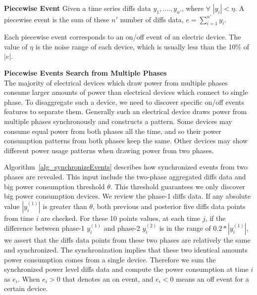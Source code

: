 \begin{definition}{\textbf{Piecewise Event}}
Given a time series diffs data $y_1, ...., y_{n'}$, where $\forall$ $|y_i| < \eta$. 
A piecewise event is the sum of these $n'$ number of diffs data, $e= \sum_{i=1}^{n'} y_i$. 
\end{definition}
Each piecewise event corresponds to an on/off event of an electric device. 
The value of $\eta$ is the noise range of each device, 
which is usually less than the 10\% of $|e|$.  

\textbf{Piecewise Events Search from Multiple Phases} \\
The majority of electrical devices which draw power from multiple phases consume larger amounts of power than electrical devices which connect to single phase. 
To disaggregate such a device, we need to 
discover specific on/off events features to separate them. 
Generally such an electrical device draws power from multiple phases synchronously 
and constructs a  pattern. 
Some devices may consume equal power from both phases all the time,  and so their power consumption patterns from both phases keep the same.
Other devices may show different power usage patterns when drawing power from two phases. 

Algorithm~\ref{alg_synchronizeEvents} describes how synchronized events from two phases are revealed.  
This input include the two-phase aggregated diffs data and big power consumption threshold $\theta$. 
This threshold guarantees we only discover big power consumption devices. 
We review the phase-1 diffs data. 
If any absolute value $|y_i^{(1)}|$ is greater than $\theta$, 
both previous and posterior five diffs data points from time $i$ are checked. 
For these 10 points values, 
at each time $j$, if the difference between phase-1 $y_i^{(1)}$ and phase-2 $y_i^{(2)}$ is in the range of $0.2*|y_i^{(1)}|$,  
we assert that the diffs data points from these two phases are relatively the same and synchronized. 
The synchronization implies that 
these two identical amounts power consumption comes from a single device. 
Therefore we sum the synchronized power level diffs data and compute the power consumption at time $i$ as $e_i$.  
When $e_i>0$ that denotes an on event, and $e_i<0$ means an off event for a certain device.

